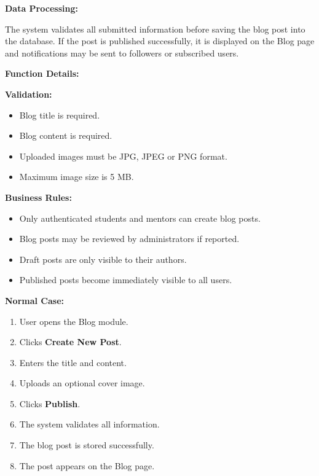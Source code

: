 \vspace{0.2cm}

\textbf{Data Processing:}

The system validates all submitted information before saving the blog post into the database. If the post is published successfully, it is displayed on the Blog page and notifications may be sent to followers or subscribed users.

\vspace{0.3cm}

\textbf{Function Details:}

\textbf{Validation:}

\begin{itemize}
    \item Blog title is required.
    \item Blog content is required.
    \item Uploaded images must be JPG, JPEG or PNG format.
    \item Maximum image size is 5 MB.
\end{itemize}

\vspace{0.2cm}

\textbf{Business Rules:}

\begin{itemize}
    \item Only authenticated students and mentors can create blog posts.
    \item Blog posts may be reviewed by administrators if reported.
    \item Draft posts are only visible to their authors.
    \item Published posts become immediately visible to all users.
\end{itemize}

\vspace{0.2cm}

\textbf{Normal Case:}

\begin{enumerate}
    \item User opens the Blog module.
    \item Clicks \textbf{Create New Post}.
    \item Enters the title and content.
    \item Uploads an optional cover image.
    \item Clicks \textbf{Publish}.
    \item The system validates all information.
    \item The blog post is stored successfully.
    \item The post appears on the Blog page.
\end{enumerate}


